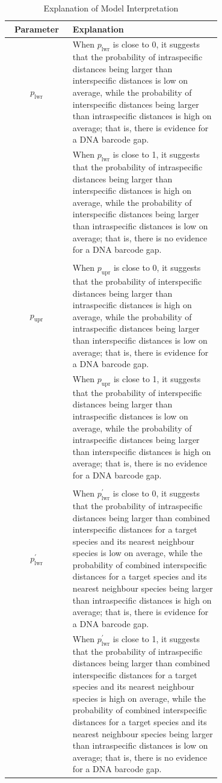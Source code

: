 \documentclass[12pt]{article}
\begin{document}
\begin{table}[htbp]
    \centering
    \small
    \caption{Explanation of Model Interpretation}
    \label{tab:parameters}
    \begin{tabular}{cp{0.7\linewidth}}
    \hline
    \textbf{Parameter} & \textbf{Explanation} \\
    \hline
    $p_{\text{lwr}}$ & When $p_{\text{lwr}}$ is close to 0, it suggests that the probability of intraspecific distances being larger than interspecific distances is low on average, while the probability of interspecific distances being larger than intraspecific distances is high on average; that is, there is evidence for a DNA barcode gap.\\
    & When $p_{\text{lwr}}$ is close to 1, it suggests that the probability of intraspecific distances being larger than interspecific distances is high on average, while the probability of interspecific distances being larger than intraspecific distances is low on average; that is, there is no evidence for a DNA barcode gap.\\
        & \\[-2mm]
    $p_{\text{upr}}$ & When $p_{\text{upr}}$ is close to 0, it suggests that the probability of interspecific distances being larger than intraspecific distances is high on average, while the probability of intraspecific distances being larger than interspecific distances is low on average; that is, there is evidence for a DNA barcode gap.\\
    & When $p_{\text{upr}}$ is close to 1, it suggests that the probability of interspecific distances being larger than intraspecific distances is low on average, while the probability of intraspecific distances being larger than interspecific distances is high on average; that is, there is no evidence for a DNA barcode gap.\\
        & \\[-2mm]
    $p^{'}_{\text{lwr}}$ & When $p^{'}_{\text{lwr}}$ is close to 0, it suggests that the probability of intraspecific distances being larger than combined interspecific distances for a target species and its nearest neighbour species is low on average, while the probability of combined interspecific distances for a target species and its nearest neighbour species being larger than intraspecific distances is high on average; that is, there is evidence for a DNA barcode gap.\\
    & When $p^{'}_{\text{lwr}}$ is close to 1, it suggests that the probability of intraspecific distances being larger than combined interspecific distances for a target species and its nearest neighbour species is high on average, while the probability of combined interspecific distances for a target species and its nearest neighbour species being larger than intraspecific distances is low on average; that is, there is no evidence for a DNA barcode gap.\\

\end{tabular}
\end{table}
\end{document}
